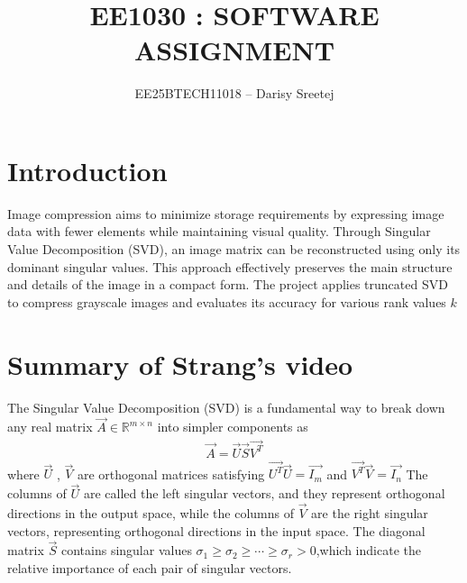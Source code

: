 \documentclass[journal,12pt,onecolumn]{IEEEtran}
\title{ EE1030 : SOFTWARE ASSIGNMENT}
\author{EE25BTECH11018 -- Darisy Sreetej}
\theoremstyle{remark}
\begin{document}
\maketitle

\section{\textbf{Introduction}}
\vspace{1em}
\begin{justify}
    
Image compression aims to minimize storage requirements by expressing image data with fewer elements while maintaining visual quality. Through Singular Value Decomposition (SVD), an image matrix can be reconstructed using only its dominant singular values. This approach effectively preserves the main structure and details of the image in a compact form. The project applies truncated SVD to compress grayscale images and evaluates its accuracy for various rank values $k$

\end{justify}
\vspace{1em}
\section{\textbf{Summary of Strang's video}}
\vspace{1em}
 \begin{justify}
    The Singular Value Decomposition (SVD) is a fundamental way to break down any real matrix $\vec{A} \in \mathbb{R}^{m \times n}$ into simpler components as 
     \begin{align*}
         \vec{A} = \vec{U}\vec{S}\vec{V^T}
     \end{align*}
     where $\vec{U}$ , $\vec{V}$ are orthogonal matrices satisfying $\vec{U^T}\vec{U} = \vec{I_m} $   and $\vec{V^T}\vec{V} = \vec{I_n} $ The columns of $\vec{U}$ are called the left singular vectors, and they represent orthogonal directions in the output space, while the columns of $\vec{V}$ are the right singular vectors, representing orthogonal directions in the input space. The diagonal matrix 
  $\vec{S}$ contains singular values $\sigma_1 \ge \sigma_2 \ge \cdots \ge \sigma_r > 0$,which indicate the relative importance of each pair of singular vectors.
 \end{justify}
\vspace{1em}
\end{document}
